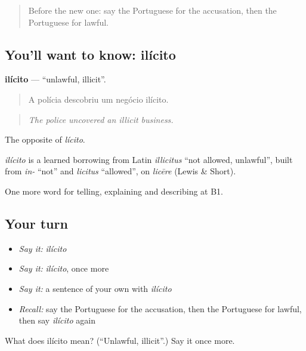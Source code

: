 \label{lesson:PT-C386-ilicito}



\begin{quote}
Before the new one: say the Portuguese for the accusation, then the Portuguese for lawful.
\end{quote}

\subsection*{You'll want to know: ilícito}
\textbf{ilícito} — \textquotedblleft{}unlawful, illicit\textquotedblright{}.

\begin{quote}
A polícia descobriu um negócio ilícito.
\end{quote}

\begin{quote}
\emph{The police uncovered an illicit business.}
\end{quote}

The opposite of \emph{lícito}.

\begin{cousinweb}
\emph{ilícito} is a learned borrowing from Latin \emph{illicitus} \textquotedblleft{}not allowed, unlawful\textquotedblright{}, built from \emph{in-} \textquotedblleft{}not\textquotedblright{} and \emph{licitus} \textquotedblleft{}allowed\textquotedblright{}, on \emph{licēre} (Lewis \& Short).
\end{cousinweb}

\begin{grammarlens}[title={What you've built}]
One more word for telling, explaining and describing at B1.
\end{grammarlens}

\subsection*{Your turn}
\begin{itemize}
\raggedright
  \item \emph{Say it:} \emph{ilícito}
  \item \emph{Say it:} \emph{ilícito}, once more
  \item \emph{Say it:} a sentence of your own with \emph{ilícito}
  \item \emph{Recall:} say the Portuguese for the accusation, then the Portuguese for lawful, then say \emph{ilícito} again
\end{itemize}

\begin{tcolorbox}[breakable,colback=teal!4,colframe=teal!35!black,title={Before you move on}]
What does ilícito mean? (\textquotedblleft{}Unlawful, illicit\textquotedblright{}.) Say it once more.
\end{tcolorbox}
